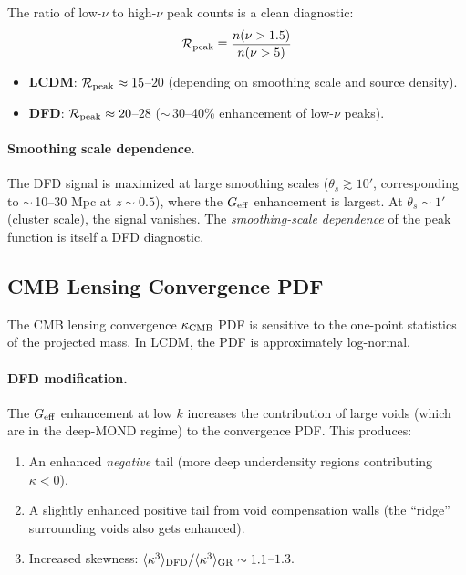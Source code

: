 \documentclass[11pt,a4paper]{article}
\newcommand{\Geff}{G_{\rm eff}}
\begin{document}
The ratio of low-$\nu$ to high-$\nu$ peak counts is a clean diagnostic:
\begin{equation}
\mathcal{R}_{\rm peak} \equiv \frac{n(\nu > 1.5)}{n(\nu > 5)}
\end{equation}

\begin{itemize}
\item \textbf{LCDM}: $\mathcal{R}_{\rm peak} \approx 15$--$20$
  (depending on smoothing scale and source density).
\item \textbf{DFD}: $\mathcal{R}_{\rm peak} \approx 20$--$28$
  ($\sim$\,30--40\% enhancement of low-$\nu$ peaks).
\end{itemize}

\paragraph{Smoothing scale dependence.}
The DFD signal is maximized at large smoothing scales
($\theta_s \gtrsim 10'$, corresponding to $\sim$\,10--30 Mpc at
$z \sim 0.5$), where the $\Geff$ enhancement is largest.  At
$\theta_s \sim 1'$ (cluster scale), the signal vanishes.  The
\emph{smoothing-scale dependence} of the peak function is itself
a DFD diagnostic.

\subsection{CMB Lensing Convergence PDF}

The CMB lensing convergence $\kappa_{\rm CMB}$ PDF is sensitive to
the one-point statistics of the projected mass.  In LCDM, the PDF
is approximately log-normal.

\paragraph{DFD modification.}
The $\Geff$ enhancement at low $k$ increases the contribution of
large voids (which are in the deep-MOND regime) to the convergence
PDF.  This produces:
\begin{enumerate}
\item An enhanced \emph{negative} tail (more deep underdensity regions
  contributing $\kappa < 0$).
\item A slightly enhanced positive tail from void compensation walls
  (the ``ridge'' surrounding voids also gets enhanced).
\item Increased skewness: $\langle\kappa^3\rangle_{\rm DFD} /
  \langle\kappa^3\rangle_{\rm GR} \sim 1.1$--$1.3$.
\end{enumerate}
\end{document}
